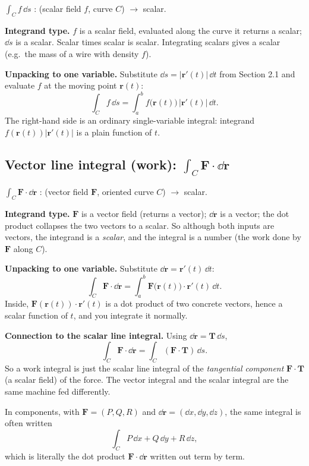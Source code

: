 \documentclass{essay}
\newcommand{\F}{\mathbf{F}}
\newcommand{\rr}{\mathbf{r}}
\newcommand{\TT}{\mathbf{T}}
\begin{document}
\begin{signature}
$\displaystyle \int_C f\,\dd s$ \;:\; (scalar field $f$, curve $C$) $\to$ scalar.
\end{signature}

\textbf{Integrand type.} $f$ is a scalar field, evaluated along the curve it returns
a scalar; $\dd s$ is a scalar. Scalar times scalar is scalar. Integrating scalars
gives a scalar (e.g.\ the mass of a wire with density $f$).

\textbf{Unpacking to one variable.} Substitute $\dd s = \lvert\rr'(t)\rvert\,\dd t$
from Section 2.1 and evaluate $f$ at the moving point $\rr(t)$:
\[
\int_C f\,\dd s = \int_a^b f\bigl(\rr(t)\bigr)\,\lvert\rr'(t)\rvert\,\dd t .
\]
The right-hand side is an ordinary single-variable integral: integrand
$f(\rr(t))\lvert\rr'(t)\rvert$ is a plain function of $t$.

\subsection{Vector line integral (work): $\int_C \F\cdot\dd\mathbf{r}$}

\begin{signature}
$\displaystyle \int_C \F\cdot\dd\mathbf{r}$ \;:\; (vector field $\F$, oriented curve
$C$) $\to$ scalar.
\end{signature}

\textbf{Integrand type.} $\F$ is a vector field (returns a vector); $\dd\mathbf{r}$ is
a vector; the dot product collapses the two vectors to a scalar. So although both
inputs are vectors, the integrand is a \emph{scalar}, and the integral is a number
(the work done by $\F$ along $C$).

\textbf{Unpacking to one variable.} Substitute $\dd\mathbf{r}=\rr'(t)\,\dd t$:
\[
\int_C \F\cdot\dd\mathbf{r}
= \int_a^b \F\bigl(\rr(t)\bigr)\cdot\rr'(t)\,\dd t .
\]
Inside, $\F(\rr(t))\cdot\rr'(t)$ is a dot product of two concrete vectors, hence a
scalar function of $t$, and you integrate it normally.

\textbf{Connection to the scalar line integral.} Using $\dd\mathbf{r}=\TT\,\dd s$,
\[
\int_C \F\cdot\dd\mathbf{r} = \int_C (\F\cdot\TT)\,\dd s .
\]
So a work integral is just the scalar line integral of the \emph{tangential
component} $\F\cdot\TT$ (a scalar field) of the force. The vector integral and the
scalar integral are the same machine fed differently.

In components, with $\F=(P,Q,R)$ and $\dd\mathbf{r}=(\dd x,\dd y,\dd z)$, the same
integral is often written
\[
\int_C P\,\dd x + Q\,\dd y + R\,\dd z,
\]
which is literally the dot product $\F\cdot\dd\mathbf{r}$ written out term by term.
\end{document}
